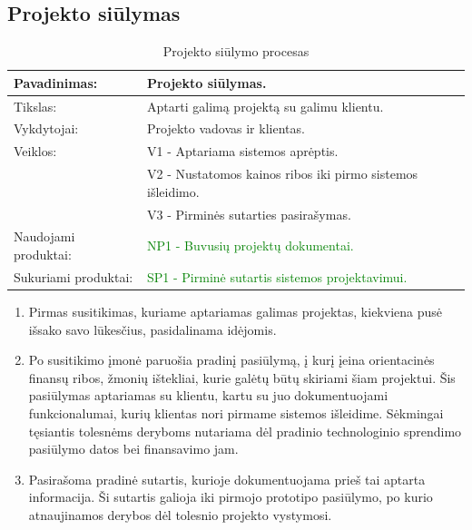 \documentclass{VUMIFPSkursinis}
\begin{document}
	\newpage

	\subsection{Projekto siūlymas}
	\begin{center}
		\begin{table}[ht]
			\caption{Projekto siūlymo procesas}
			\begin{tabular}{ | l | l | }
				\hline
				Pavadinimas:		& Projekto siūlymas.						\\ \hline
				Tikslas:		& Aptarti galimą projektą su galimu klientu.			\\ \hline
				Vykdytojai:		& Projekto vadovas ir klientas.					\\ \hline
				Veiklos:		& V1 - Aptariama sistemos aprėptis. 				\\
							& V2 - Nustatomos kainos ribos iki pirmo sistemos išleidimo.	\\
							& V3 - Pirminės sutarties pasirašymas.				\\ \hline
				Naudojami produktai:	& \textcolor{green}{NP1 - Buvusių projektų dokumentai. }				\\ \hline
				Sukuriami produktai:	& \textcolor{green}{SP1 - Pirminė sutartis sistemos projektavimui.	}	\\ \hline
			\end{tabular}
		\end{table}
	\end{center}

	\begin{enumerate}
		\item{
			Pirmas susitikimas, kuriame aptariamas galimas projektas, kiekviena pusė išsako savo lūkesčius, pasidalinama idėjomis.
		}
		\item{
			Po susitikimo įmonė paruošia pradinį pasiūlymą, į kurį įeina orientacinės finansų ribos, žmonių ištekliai, kurie galėtų būtų skiriami šiam projektui.
			Šis pasiūlymas aptariamas su klientu, kartu su juo dokumentuojami funkcionalumai, kurių klientas nori pirmame sistemos išleidime.
			Sėkmingai tęsiantis tolesnėms deryboms nutariama dėl pradinio technologinio sprendimo pasiūlymo datos bei finansavimo jam.
		}
		\item{
			Pasirašoma pradinė sutartis, kurioje dokumentuojama prieš tai aptarta informacija.
			Ši sutartis galioja iki pirmojo prototipo pasiūlymo, po kurio atnaujinamos derybos dėl tolesnio projekto vystymosi.
		}
	\end{enumerate}
\end{document}
